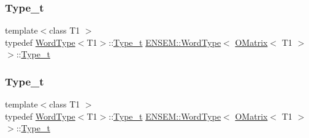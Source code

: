 \subsubsection{\texorpdfstring{Type\_t}{Type\_t}\hspace{0.1cm}{\footnotesize\ttfamily [1/3]}}
{\footnotesize\ttfamily template$<$class T1 $>$ \\
typedef \mbox{\hyperlink{structENSEM_1_1WordType}{Word\+Type}}$<$T1$>$\+::\mbox{\hyperlink{structENSEM_1_1WordType_3_01OMatrix_3_01T1_01_4_01_4_a37e42971b324dfc3027d9f416e3d7d00}{Type\+\_\+t}} \mbox{\hyperlink{structENSEM_1_1WordType}{E\+N\+S\+E\+M\+::\+Word\+Type}}$<$ \mbox{\hyperlink{classENSEM_1_1OMatrix}{O\+Matrix}}$<$ T1 $>$ $>$\+::\mbox{\hyperlink{structENSEM_1_1WordType_3_01OMatrix_3_01T1_01_4_01_4_a37e42971b324dfc3027d9f416e3d7d00}{Type\+\_\+t}}}

\mbox{\label{structENSEM_1_1WordType_3_01OMatrix_3_01T1_01_4_01_4_a37e42971b324dfc3027d9f416e3d7d00}} 
\subsubsection{\texorpdfstring{Type\_t}{Type\_t}\hspace{0.1cm}{\footnotesize\ttfamily [2/3]}}
{\footnotesize\ttfamily template$<$class T1 $>$ \\
typedef \mbox{\hyperlink{structENSEM_1_1WordType}{Word\+Type}}$<$T1$>$\+::\mbox{\hyperlink{structENSEM_1_1WordType_3_01OMatrix_3_01T1_01_4_01_4_a37e42971b324dfc3027d9f416e3d7d00}{Type\+\_\+t}} \mbox{\hyperlink{structENSEM_1_1WordType}{E\+N\+S\+E\+M\+::\+Word\+Type}}$<$ \mbox{\hyperlink{classENSEM_1_1OMatrix}{O\+Matrix}}$<$ T1 $>$ $>$\+::\mbox{\hyperlink{structENSEM_1_1WordType_3_01OMatrix_3_01T1_01_4_01_4_a37e42971b324dfc3027d9f416e3d7d00}{Type\+\_\+t}}}

\mbox{\label{structENSEM_1_1WordType_3_01OMatrix_3_01T1_01_4_01_4_a37e42971b324dfc3027d9f416e3d7d00}} 
